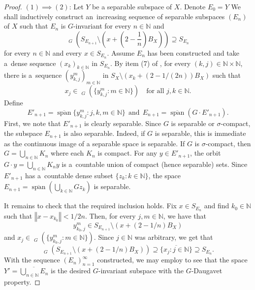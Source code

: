 \documentclass[a4paper,12pt]{amsart}
\theoremstyle{definition}
\theoremstyle{definition}
\theoremstyle{remark}
\numberwithin{equation}{section}
\newcommand{\N}{\mathbb{N}}
\newcommand{\clco}{\mathop{\overline{\mathrm{co}}}\nolimits}
\newcommand{\<}{\langle}
\renewcommand{\>}{\rangle}
\newcommand{\norm}[1]{\left\Vert#1\right\Vert}
\newcommand{\clspan}{\overline{\operatorname{span}}}
\begin{document}
\begin{proof}
		$(1) \implies (2)$:
		Let $Y$ be a separable subspace of $X$. Denote $E_0 = Y$ We shall inductively construct an~increasing sequence of separable subspaces $(E_n)$ of $X$ such that $E_n$ is $G$-invariant for every $n \in \N$ and
		\begin{equation*}
			\clco_{G} \left( S_{E_{n+1}} \setminus \left( x + \left( 2 - \frac{1}{n} \right) B_X \right) \right) \supseteq S_{E_n}
		\end{equation*}
		for every $n \in \N$ and every $x \in S_{E_n}$. Assume $E_n$ has been constructed and take a~dense sequence $(x_k)_{k \in \N}$ in $S_{E_n}$.
		By item (7) of , for every $(k,j) \in \N \times \N$, there is a~sequence $(y_{k,j}^m)_{m \in \N}$ in $S_X \setminus (x_k + (2 - 1/(2n)) B_X)$ such that
		\begin{equation*}
			x_j \in \clco_G(\{y_{k,j}^m : m \in \N\})
			\quad \text{for all } j,k \in \N.
		\end{equation*}
		Define
		\begin{equation*}
			E'_{n+1} = \clspan \{ y_{k, j}^m \colon j, k, m \in \N \} \ \ \mbox{and} \ \ 
			E_{n+1} = \clspan (G \cdot E'_{n+1}).
		\end{equation*}
		First, we note that $E'_{n+1}$ is clearly separable.
		Since $G$ is separable or $\sigma$-compact, the subspace $E_{n+1}$ is also separable. Indeed, if $G$ is separable, this is immediate as the continuous image of a separable space is separable. If $G$ is $\sigma$-compact, then $G = \bigcup_{n \in \N} K_n$ where each $K_n$ is compact. For any $y \in E'_{n+1}$, the orbit $G\cdot y = \bigcup_{n \in \N} K_n y$ is a~countable union of compact (hence separable) sets. Since $E'_{n+1}$ has a~countable dense subset $\{z_k : k \in \N\}$, the space $E_{n+1} = \clspan(\bigcup_{k \in \N} Gz_k)$ is separable.
		
		It remains to check that the required inclusion holds. Fix $x \in S_{E_n}$ and find $k_0 \in \N$ such that $\norm{x - x_{k_0}} < 1/2n$. Then, for every $j,m \in \N$, we have that
		\begin{equation*}
			y_{k_0, j}^m \in S_{E_{n+1}} \setminus (x + (2 - 1/n) B_X)
		\end{equation*}
		and $x_j \in \clco_{G}(\{y_{k_0, j}^m : m \in \N\})$.
		Since $j \in \N$ was arbitrary, we get that
		\begin{equation*}
			\clco_{G}(S_{E_{n+1}} \setminus (x + (2 - 1/n) B_X))
			\supseteq \overline{\{x_j: j \in \N\}}
			\supseteq S_{E_n}.
		\end{equation*}
		With the sequence $(E_n)_{n=1}^\infty$ constructed, we may employ  to see that the space $Y' = \overline{\bigcup_{n \in \N} E_n}$ is the desired $G$-invariant subspace with the $G$-Daugavet property.
	\end{proof}
	
\end{document}
